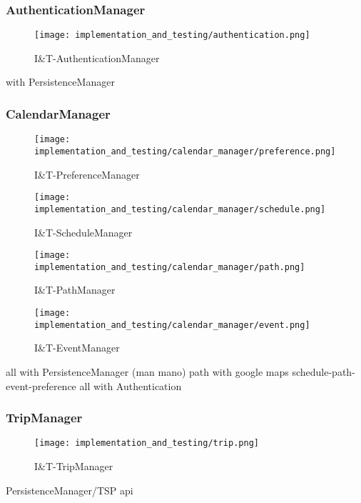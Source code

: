 \subsubsection{AuthenticationManager}
\begin{figure}[H]
	\begin{center}
		\texttt{[image: implementation\_and\_testing/authentication.png]}
	\end{center}
	\caption{I\&T-AuthenticationManager}
\end{figure}
with PersistenceManager

\subsubsection{CalendarManager}
\begin{figure}[H]
	\begin{center}
		\texttt{[image: implementation\_and\_testing/calendar\_manager/preference.png]}
	\end{center}
	\caption{I\&T-PreferenceManager}
\end{figure}

\begin{figure}[H]
	\begin{center}
		\texttt{[image: implementation\_and\_testing/calendar\_manager/schedule.png]}
	\end{center}
	\caption{I\&T-ScheduleManager}
\end{figure}

\begin{figure}[H]
	\begin{center}
		\texttt{[image: implementation\_and\_testing/calendar\_manager/path.png]}
	\end{center}
	\caption{I\&T-PathManager}
\end{figure}

\begin{figure}[H]
	\begin{center}
		\texttt{[image: implementation\_and\_testing/calendar\_manager/event.png]}
	\end{center}
	\caption{I\&T-EventManager}
\end{figure}
all with PersistenceManager (man mano)
path with google maps
schedule-path-event-preference
all with Authentication

\subsubsection{TripManager}
\begin{figure}[H]
	\begin{center}
		\texttt{[image: implementation\_and\_testing/trip.png]}
	\end{center}
	\caption{I\&T-TripManager}
\end{figure}
PersistenceManager/TSP api

